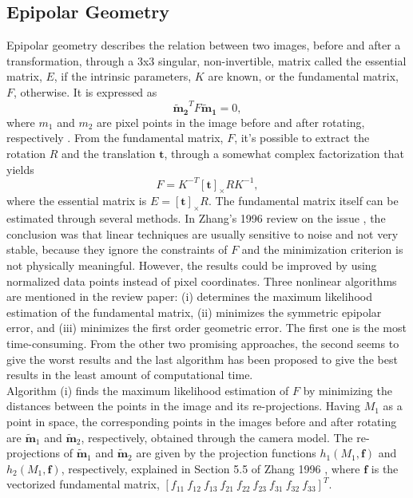 \subsection{Epipolar Geometry}
\label{eppppp}
Epipolar geometry describes the relation between two images, before and after a transformation, through a 3x3 singular, non-invertible, matrix called the essential matrix, \textbf{$E$}, if the intrinsic parameters, $K$ are known, or the fundamental matrix, \textbf{$F$}, otherwise. It is expressed as 
\begin{equation}
\label{sec2:eq:epipolar}
\mathbf{\tilde{m}_2}^T F \mathbf{\tilde{m}_1} = 0,
\end{equation}
where ${m}_1$ and ${m}_2$ are pixel points in the image before and after rotating, respectively \cite{multiview}. 
From the fundamental matrix, $F$, it's possible to extract the rotation $R$ and the translation $\mathbf{t}$, through a somewhat complex factorization that yields
\begin{equation}
    F = K^{-T}[\mathbf{t}]_\times R K^{-1},
    \label{deewfwfe}
\end{equation}
where the essential matrix is $E = [\mathbf{t}]_\times R$. 
The fundamental matrix itself can be estimated through several methods. In Zhang's 1996 review on the issue \cite{detep}, the conclusion was that linear techniques are usually sensitive to noise and not very stable, because they ignore the constraints of $F$ and the minimization criterion is not physically meaningful. However, the results could be improved by using normalized data points instead of pixel coordinates. Three nonlinear algorithms are mentioned in the review paper: (i) determines the maximum likelihood estimation of the fundamental matrix, (ii) minimizes the symmetric epipolar error, and (iii) minimizes the first order geometric error. The first one is the most time-consuming. From the other two promising approaches, the second seems to give the worst results and the last algorithm has been proposed to give the best results in the least amount of computational time. \\

Algorithm (i) finds the maximum likelihood estimation of $F$ by minimizing the distances between the points in the image and its re-projections. Having $M_1$ as a point in space, the corresponding points in the images before and after rotating are $\widetilde{\mathbf{m}}_{1}$ and $\widetilde{\mathbf{m}}_{2}$, respectively, obtained through the camera model.
The re-projections of $\widetilde{\mathbf{m}}_{1}$ and $\widetilde{\mathbf{m}}_{2}$ are given by the projection functions $h_1(M_1, \mathbf{f})$ and $h_2(M_1, \mathbf{f})$, respectively, explained in Section 5.5 of Zhang 1996 \cite{detep}, where $\mathbf{f}$ is the vectorized fundamental matrix, $[f_{11} \ f_{12} \ f_{13} \ f_{21} \ f_{22} \ f_{23} \ f_{31} \ f_{32} \ f_{33}]^T$.

